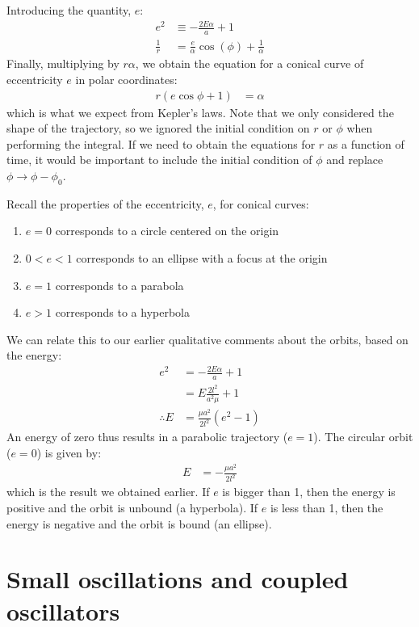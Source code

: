 Introducing the quantity, $e$:
\begin{align}
e^2&\equiv -\frac{2E\alpha}{a}+1\nonumber\\
\frac{1}{r}&=\frac{e}{\alpha}\cos(\phi)+\frac{1}{\alpha}\nonumber
\end{align}
Finally, multiplying by $r\alpha$, we obtain the equation for a conical curve of eccentricity $e$ in polar coordinates:
\begin{align}
r(e\cos\phi+1)&=\alpha\nonumber
\end{align}
which is what we expect from Kepler's laws. Note that we only considered the shape of the trajectory, so we ignored the initial condition on $r$ or $\phi$ when performing the integral. If we need to obtain the equations for $r$ as a function of time, it would be important to include the initial condition of $\phi$ and replace $\phi\to\phi-\phi_0$.

Recall the properties of the eccentricity, $e$, for conical curves:
\begin{enumerate}
\item $e=0$ corresponds to a circle centered on the origin
\item $0< e < 1$ corresponds to an ellipse with a focus at the origin
\item $e=1$ corresponds to a parabola
\item $e>1$ corresponds to a hyperbola
\end{enumerate}

We can relate this to our earlier qualitative comments about the orbits, based on the energy:
\begin{align}
e^2&=-\frac{2E\alpha}{a}+1 \nonumber\\
&=E\frac{2l^2}{a^2\mu}+1\nonumber\\
\therefore E&=\frac{\mu a^2}{2l^2}(e^2-1)
\end{align}
An energy of zero thus results in a parabolic trajectory ($e=1$). The circular orbit ($e=0$) is given by: 
\begin{align}
E&=-\frac{\mu a^2}{2l^2}\nonumber
\end{align} 
which is the result we obtained earlier. If $e$ is bigger than 1, then the energy is positive and the orbit is unbound (a hyperbola). If $e$ is less than 1, then the energy is negative and the orbit is bound (an ellipse). 

\section{Small oscillations and coupled oscillators}

